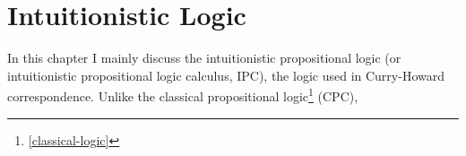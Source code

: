 \chapter{Intuitionistic Logic}
\label{intuitionistic-logic}

In this chapter I mainly discuss the intuitionistic propositional logic
(or intuitionistic propositional logic calculus, IPC), the logic used
in Curry-Howard correspondence. Unlike the classical propositional 
logic\footnote{\autoref{classical-logic}} (CPC),
